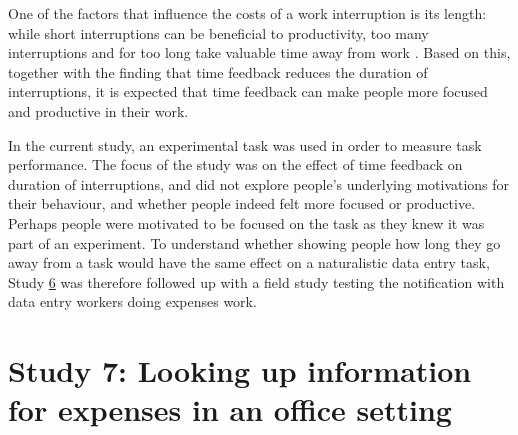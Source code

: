 One of the factors that influence the costs of a work interruption is its length: while short interruptions can be beneficial to productivity, too many interruptions and for too long take valuable time away from work \citep{Mark2018}. Based on this, together with the finding that time feedback reduces the duration of interruptions, it is expected that time feedback can make people more focused and productive in their work. 

In the current study, an experimental task was used in order to measure task performance. The focus of the study was on the effect of time feedback on duration of interruptions, and did not explore people's underlying motivations for their behaviour, and whether people indeed felt more focused or productive. Perhaps people were motivated to be focused on the task as they knew it was part of an experiment. To understand whether showing people how long they go away from a task would have the same effect on a naturalistic data entry task, Study \hyperref[st:Study6]{6} was therefore followed up with a field study testing the notification with data entry workers doing expenses work. 


\section{Study 7: Looking up information for expenses in an office setting}\label{st:Study7}
